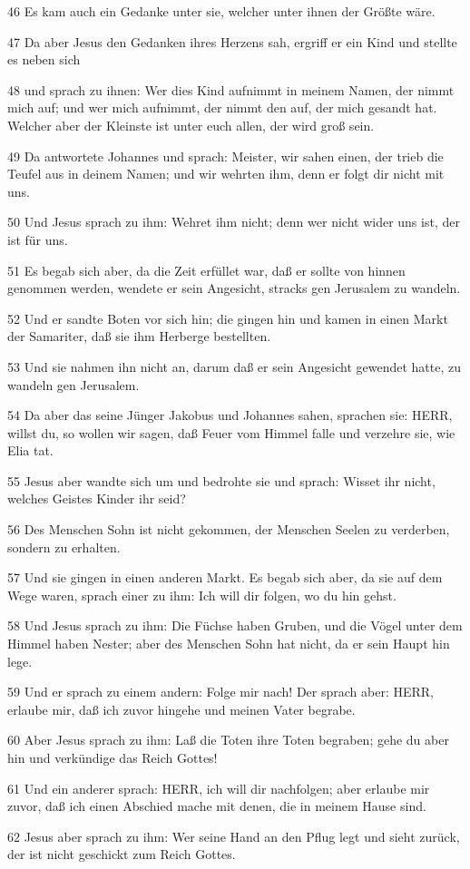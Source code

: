 \par 46 Es kam auch ein Gedanke unter sie, welcher unter ihnen der Größte wäre.
\par 47 Da aber Jesus den Gedanken ihres Herzens sah, ergriff er ein Kind und stellte es neben sich
\par 48 und sprach zu ihnen: Wer dies Kind aufnimmt in meinem Namen, der nimmt mich auf; und wer mich aufnimmt, der nimmt den auf, der mich gesandt hat. Welcher aber der Kleinste ist unter euch allen, der wird groß sein.
\par 49 Da antwortete Johannes und sprach: Meister, wir sahen einen, der trieb die Teufel aus in deinem Namen; und wir wehrten ihm, denn er folgt dir nicht mit uns.
\par 50 Und Jesus sprach zu ihm: Wehret ihm nicht; denn wer nicht wider uns ist, der ist für uns.
\par 51 Es begab sich aber, da die Zeit erfüllet war, daß er sollte von hinnen genommen werden, wendete er sein Angesicht, stracks gen Jerusalem zu wandeln.
\par 52 Und er sandte Boten vor sich hin; die gingen hin und kamen in einen Markt der Samariter, daß sie ihm Herberge bestellten.
\par 53 Und sie nahmen ihn nicht an, darum daß er sein Angesicht gewendet hatte, zu wandeln gen Jerusalem.
\par 54 Da aber das seine Jünger Jakobus und Johannes sahen, sprachen sie: HERR, willst du, so wollen wir sagen, daß Feuer vom Himmel falle und verzehre sie, wie Elia tat.
\par 55 Jesus aber wandte sich um und bedrohte sie und sprach: Wisset ihr nicht, welches Geistes Kinder ihr seid?
\par 56 Des Menschen Sohn ist nicht gekommen, der Menschen Seelen zu verderben, sondern zu erhalten.
\par 57 Und sie gingen in einen anderen Markt. Es begab sich aber, da sie auf dem Wege waren, sprach einer zu ihm: Ich will dir folgen, wo du hin gehst.
\par 58 Und Jesus sprach zu ihm: Die Füchse haben Gruben, und die Vögel unter dem Himmel haben Nester; aber des Menschen Sohn hat nicht, da er sein Haupt hin lege.
\par 59 Und er sprach zu einem andern: Folge mir nach! Der sprach aber: HERR, erlaube mir, daß ich zuvor hingehe und meinen Vater begrabe.
\par 60 Aber Jesus sprach zu ihm: Laß die Toten ihre Toten begraben; gehe du aber hin und verkündige das Reich Gottes!
\par 61 Und ein anderer sprach: HERR, ich will dir nachfolgen; aber erlaube mir zuvor, daß ich einen Abschied mache mit denen, die in meinem Hause sind.
\par 62 Jesus aber sprach zu ihm: Wer seine Hand an den Pflug legt und sieht zurück, der ist nicht geschickt zum Reich Gottes.

